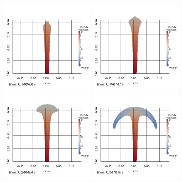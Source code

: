 \begin{figure}
\begin{center}
\subcaptionbox{\label{top:jet:Gy:1}}
{
\includegraphics[width=0.4\textwidth]{topology/JetGrand/speedy0001.jpg}
}
\subcaptionbox{\label{top:jet:Gy:2}}
{
\includegraphics[width=0.4\textwidth]{topology/JetGrand/speedy0002.jpg}
}
\subcaptionbox{\label{top:jet:Gy:3}}
{
\includegraphics[width=0.4\textwidth]{topology/JetGrand/speedy0003.jpg}
}
\subcaptionbox{\label{top:jet:Gy:4}}
{
\includegraphics[width=0.4\textwidth]{topology/JetGrand/speedy0004.jpg}
}
\end{center}
\end{figure}
